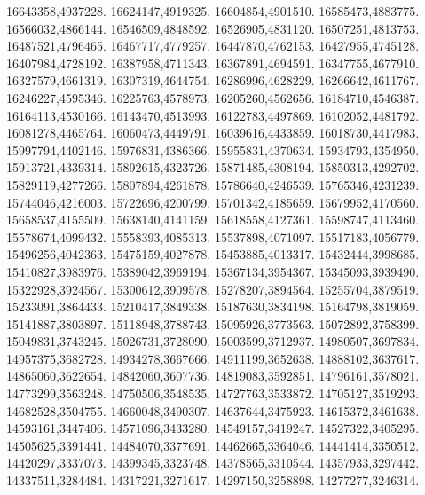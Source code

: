 16643358,4937228.
16624147,4919325.
16604854,4901510.
16585473,4883775.
16566032,4866144.
16546509,4848592.
16526905,4831120.
16507251,4813753.
16487521,4796465.
16467717,4779257.
16447870,4762153.
16427955,4745128.
16407984,4728192.
16387958,4711343.
16367891,4694591.
16347755,4677910.
16327579,4661319.
16307319,4644754.
16286996,4628229.
16266642,4611767.
16246227,4595346.
16225763,4578973.
16205260,4562656.
16184710,4546387.
16164113,4530166.
16143470,4513993.
16122783,4497869.
16102052,4481792.
16081278,4465764.
16060473,4449791.
16039616,4433859.
16018730,4417983.
15997794,4402146.
15976831,4386366.
15955831,4370634.
15934793,4354950.
15913721,4339314.
15892615,4323726.
15871485,4308194.
15850313,4292702.
15829119,4277266.
15807894,4261878.
15786640,4246539.
15765346,4231239.
15744046,4216003.
15722696,4200799.
15701342,4185659.
15679952,4170560.
15658537,4155509.
15638140,4141159.
15618558,4127361.
15598747,4113460.
15578674,4099432.
15558393,4085313.
15537898,4071097.
15517183,4056779.
15496256,4042363.
15475159,4027878.
15453885,4013317.
15432444,3998685.
15410827,3983976.
15389042,3969194.
15367134,3954367.
15345093,3939490.
15322928,3924567.
15300612,3909578.
15278207,3894564.
15255704,3879519.
15233091,3864433.
15210417,3849338.
15187630,3834198.
15164798,3819059.
15141887,3803897.
15118948,3788743.
15095926,3773563.
15072892,3758399.
15049831,3743245.
15026731,3728090.
15003599,3712937.
14980507,3697834.
14957375,3682728.
14934278,3667666.
14911199,3652638.
14888102,3637617.
14865060,3622654.
14842060,3607736.
14819083,3592851.
14796161,3578021.
14773299,3563248.
14750506,3548535.
14727763,3533872.
14705127,3519293.
14682528,3504755.
14660048,3490307.
14637644,3475923.
14615372,3461638.
14593161,3447406.
14571096,3433280.
14549157,3419247.
14527322,3405295.
14505625,3391441.
14484070,3377691.
14462665,3364046.
14441414,3350512.
14420297,3337073.
14399345,3323748.
14378565,3310544.
14357933,3297442.
14337511,3284484.
14317221,3271617.
14297150,3258898.
14277277,3246314.
